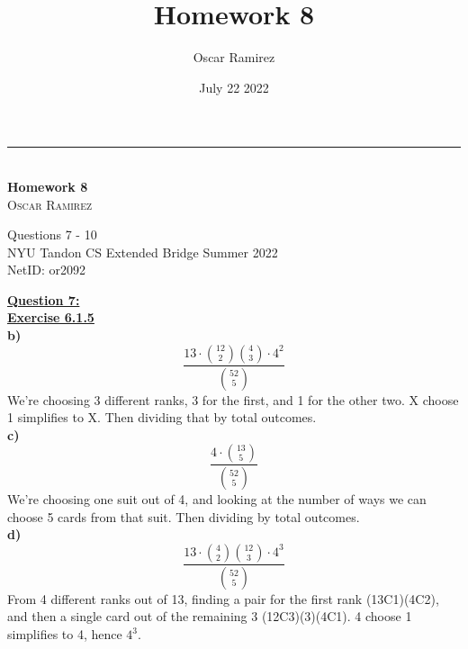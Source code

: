 \documentclass[12pt, letterpaper, twoside]{article}
\title{\textbf{Homework 8}}
\author{Oscar Ramirez}
\date{July 22 2022}
\begin{document}
\begin{titlepage}   

    \raggedleft %

    \rule{1pt}{\textheight} %
    \hspace{0.05\textwidth} %
    \parbox[b]{0.75\textwidth}{ %
        {\large\textit{}}\\[4\baselineskip]

        {\Huge\bfseries Homework 8}\\[2\baselineskip] %

        {\Large\textsc{Oscar Ramirez}} %

        \vspace{0.47\textheight} %
        {\noindent Questions 7 - 10}\\[0.1\baselineskip]
        {\noindent NYU Tandon CS Extended Bridge Summer 2022}\\[0.1\baselineskip]
        {\noindent NetID: or2092}\\[\baselineskip]
    }

\end{titlepage}
\newpage\noindent \textbf{\underline{Question 7:}}\\
\break
\textbf{\underline{Exercise 6.1.5}}\\
\break
\textbf{b)}\\
\[\frac{13 \cdot \binom{12}{2}\binom{4}{3}\cdot 4^2}{\binom{52}{5}}\]
\indent We're choosing 3 different ranks, 3 for the first, and 1 for the other two. X choose 1 simplifies to X. Then dividing that by total outcomes.\\
\break
\textbf{c)}\\
\[\frac{4 \cdot\binom{13}{5}}{\binom{52}{5}}\]
\indent We're choosing one suit out of 4, and looking at the number of ways we can choose 5 cards from that suit. Then dividing by total outcomes.\\
\break
\textbf{d)}\\
\[\frac{13 \cdot \binom{4}{2}\binom{12}{3}\cdot 4^3}{\binom{52}{5}}\]
\indent From 4 different ranks out of 13, finding a pair for the first rank (13C1)(4C2), and then a single card out of the remaining 3 (12C3)(3)(4C1). 4 choose 1 simplifies to 4, hence $4^3$.\\
\end{document}
